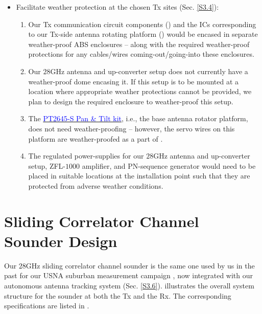 \documentclass[12pt]{article}
\begin{document}
\begin{itemize}
\begin{itemize}
                \item Facilitate weather protection at the chosen Tx sites (Sec. \ref{S3.4}):
                \begin{enumerate}
                    \item Our Tx communication circuit components () and the ICs corresponding to our Tx-side antenna rotating platform () would be encased in separate weather-proof ABS enclosures -- along with the required weather-proof protections for any cables/wires coming-out/going-into these enclosures.\label{item1}
                    \item Our $28$GHz antenna and up-converter setup does not currently have a weather-proof dome encasing it. If this setup is to be mounted at a location where appropriate weather protections cannot be provided, we plan to design the required enclosure to weather-proof this setup.
                    \item The \href{https://www.servocity.com/pt2645-s-pan-tilt/}{\textcolor{blue}{PT2645-S Pan \& Tilt kit}}, i.e., the base antenna rotator platform, does not need weather-proofing -- however, the servo wires on this platform are weather-proofed as a part of .
                    \item The regulated power-supplies for our $28$GHz antenna and up-converter setup, ZFL-$1000$ amplifier, and PN-sequence generator would need to be placed in suitable locations at the installation point such that they are protected from adverse weather conditions.
                \end{enumerate}
            \end{itemize}
        \end{itemize}
    
\section{Sliding Correlator Channel Sounder Design}\label{S3.5}
    Our $28$GHz sliding correlator channel sounder is the same one used by us in the past for our USNA suburban measurement campaign \cite{8422820}, now integrated with our autonomous antenna tracking system (Sec. \ref{S3.6}).  illustrates the overall system structure for the sounder at both the Tx and the Rx. The corresponding specifications are listed in . \newline
    
\end{document}

